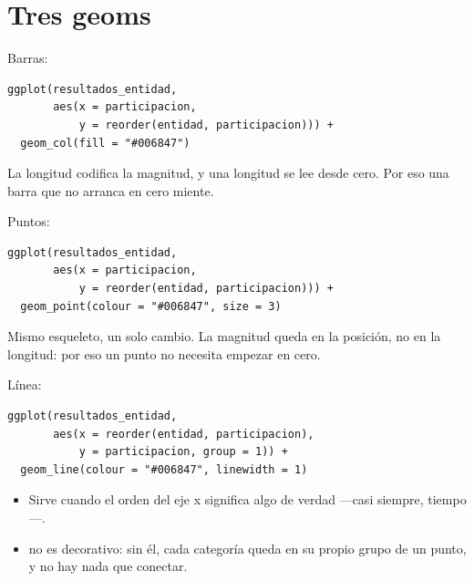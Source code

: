 \section{Tres geoms}

\begin{frame}[fragile]{Barras: }
\begin{lstlisting}
ggplot(resultados_entidad,
       aes(x = participacion,
           y = reorder(entidad, participacion))) +
  geom_col(fill = "#006847")
\end{lstlisting}

  \vspace{0.6em}
  La longitud codifica la magnitud, y una longitud se lee desde cero. Por
  eso una barra que no arranca en cero miente.
\end{frame}

\begin{frame}[fragile]{Puntos: }
\begin{lstlisting}
ggplot(resultados_entidad,
       aes(x = participacion,
           y = reorder(entidad, participacion))) +
  geom_point(colour = "#006847", size = 3)
\end{lstlisting}

  \vspace{0.6em}
  Mismo esqueleto, un solo cambio. La magnitud queda en la
  \ac{posición}, no en la longitud: por eso un punto no necesita empezar
  en cero.
\end{frame}

\begin{frame}[fragile]{Línea: }
\begin{lstlisting}
ggplot(resultados_entidad,
       aes(x = reorder(entidad, participacion),
           y = participacion, group = 1)) +
  geom_line(colour = "#006847", linewidth = 1)
\end{lstlisting}

  \vspace{0.5em}
  \begin{itemize}\setlength{\itemsep}{0.7em}
    \item<1-> Sirve cuando el orden del eje x significa algo de verdad
          —casi siempre, tiempo—.
    \item<2->  no es decorativo: sin él, cada categoría
          queda en su propio grupo de un punto, y no hay nada que
          conectar.
  \end{itemize}
\end{frame}

